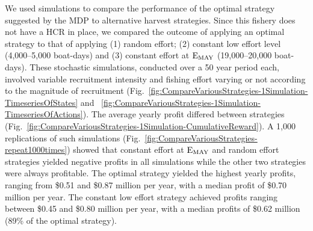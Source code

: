 We used simulations to  compare the performance of the optimal strategy suggested by the MDP to alternative harvest strategies. Since this fishery does not have a HCR in place, we compared the outcome of applying an optimal strategy to that of applying (1) random effort; (2) constant low effort level (4,000--5,000 boat-days) and (3) constant effort at $\rm{E_{MAY}}$ (19,000--20,000 boat-days). These stochastic simulations, conducted over a 50 year period each, involved variable recruitment intensity and fishing effort varying or not according to the magnitude of recruitment (Fig.~\ref{fig:CompareVariousStrategies-1Simulation-TimeseriesOfStates} and ~\ref{fig:CompareVariousStrategies-1Simulation-TimeseriesOfActions}). The average yearly profit differed between strategies (Fig.~\ref{fig:CompareVariousStrategies-1Simulation-CumulativeReward}). A 1,000 replications of such simulations (Fig.~\ref{fig:CompareVariousStrategies-repeat1000times}) showed that constant effort at $\rm{E_{MAY}}$ and random effort strategies yielded negative profits in all simulations while the other two strategies were always profitable. The optimal strategy yielded the highest yearly profits, ranging from \$0.51 and \$0.87 million per year, with a median profit of \$0.70 million per year. The constant low effort strategy achieved profits ranging between \$0.45 and \$0.80 million per year, with a median profits of \$0.62 million (89\% of the optimal strategy). \\





